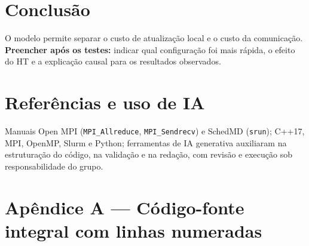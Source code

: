 \documentclass[10pt,a4paper,twocolumn]{article}
\begin{document}
\section*{Conclus\~ao}
O modelo permite separar o custo de atualiza\c{c}\~ao local e o custo da comunica\c{c}\~ao. \textbf{Preencher ap\'os os testes:} indicar qual configura\c{c}\~ao foi mais r\'apida, o efeito do HT e a explica\c{c}\~ao causal para os resultados observados.

\section*{Refer\^encias e uso de IA}
Manuais Open MPI (\texttt{MPI\_Allreduce}, \texttt{MPI\_Sendrecv}) e SchedMD (\texttt{srun}); C++17, MPI, OpenMP, Slurm e Python; ferramentas de IA generativa auxiliaram na estrutura\c{c}\~ao do c\'odigo, na valida\c{c}\~ao e na reda\c{c}\~ao, com revis\~ao e execu\c{c}\~ao sob responsabilidade do grupo.

\clearpage
\onecolumn
\appendix
\section*{Ap\^endice A --- C\'odigo-fonte integral com linhas numeradas}

\end{document}
